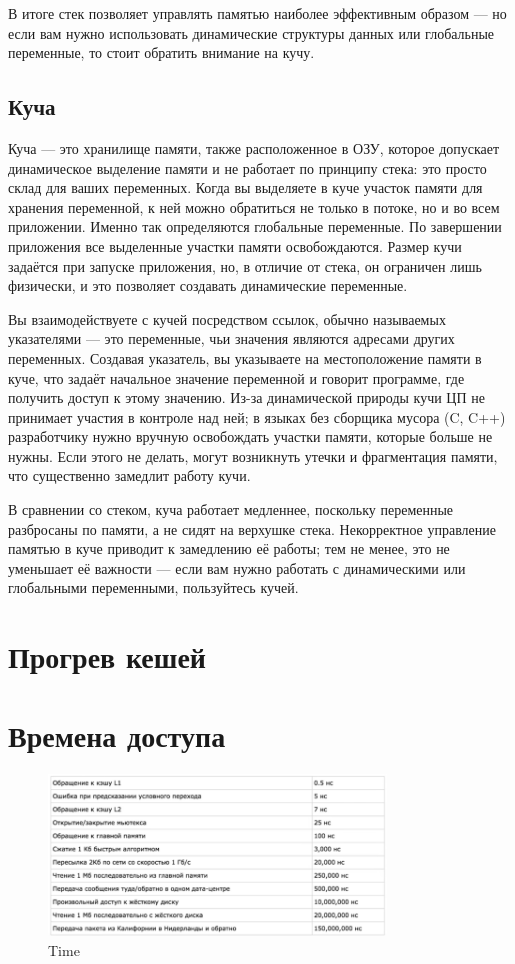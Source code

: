 В итоге стек позволяет управлять памятью наиболее эффективным образом — но если вам нужно использовать динамические структуры данных или глобальные переменные, то стоит обратить внимание на кучу.

\subsection{Куча}

Куча — это хранилище памяти, также расположенное в ОЗУ, которое допускает динамическое выделение памяти и не работает по принципу стека: это просто склад для ваших переменных. Когда вы выделяете в куче участок памяти для хранения переменной, к ней можно обратиться не только в потоке, но и во всем приложении. Именно так определяются глобальные переменные. По завершении приложения все выделенные участки памяти освобождаются. Размер кучи задаётся при запуске приложения, но, в отличие от стека, он ограничен лишь физически, и это позволяет создавать динамические переменные.

Вы взаимодействуете с кучей посредством ссылок, обычно называемых указателями — это переменные, чьи значения являются адресами других переменных. Создавая указатель, вы указываете на местоположение памяти в куче, что задаёт начальное значение переменной и говорит программе, где получить доступ к этому значению. Из-за динамической природы кучи ЦП не принимает участия в контроле над ней; в языках без сборщика мусора (C, C++) разработчику нужно вручную освобождать участки памяти, которые больше не нужны. Если этого не делать, могут возникнуть утечки и фрагментация памяти, что существенно замедлит работу кучи.

В сравнении со стеком, куча работает медленнее, поскольку переменные разбросаны по памяти, а не сидят на верхушке стека. Некорректное управление памятью в куче приводит к замедлению её работы; тем не менее, это не уменьшает её важности — если вам нужно работать с динамическими или глобальными переменными, пользуйтесь кучей.

\section{Прогрев кешей}

\section{Времена доступа}

\begin{figure}[h!]
\centering
\includegraphics[width=0.8\textwidth]{img/time.png}
\caption{Time}
\label{time}
\end{figure}
